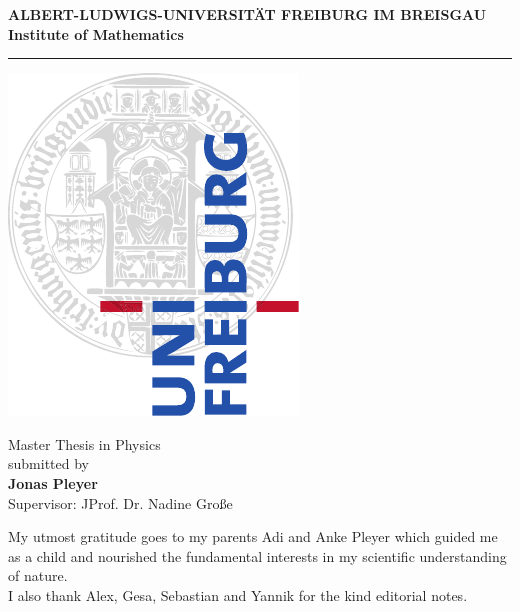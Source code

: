 \begin{titlepage}
\thispagestyle{empty}
\begin{center}
 
\Large\textbf{ALBERT-LUDWIGS-UNIVERSITÄT FREIBURG IM BREISGAU\\}
\vspace{0.5cm}
\Large\textbf{Institute of Mathematics}

\rule{\textwidth}{1pt}
\vspace{1.5cm}

\Large\textbf{\Title}

\vspace{1.5cm}

\includegraphics{uni-logos/pdf/ufcd-logo-e1-a4-color.pdf}

\vfill

\normalsize
Master Thesis in Physics\\
\vspace{0.5cm}
submitted \Date\hspace{0pt} by\\
\vspace{0.5cm}
\Large\textbf{Jonas Pleyer}\\
\normalsize
\vspace{0.5cm}
\large Supervisor: JProf. Dr. Nadine Große\\
\normalsize

\newpage
\thispagestyle{empty}
My utmost gratitude goes to my parents Adi and Anke Pleyer which guided me as a child and nourished the fundamental interests in my scientific understanding of nature.\\
\vfill
I also thank Alex, Gesa, Sebastian and Yannik for the kind editorial notes.

\end{center}

\newpage\null\thispagestyle{empty}\newpage
\end{titlepage}
\thispagestyle{empty}
